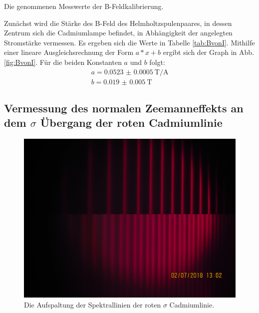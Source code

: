 \begin{table}
	\centering
	\caption{Die genommenen Messwerte der B-Feldkalibrierung.}
	
	
	\label{tab:BvonI}
\end{table}

Zunächst wird die Stärke des B-Feld des Helmholtzspulenpaares, in dessen Zentrum sich die Cadmiumlampe befindet, in Abhängigkeit der angelegten Stromstärke vermessen. Es ergeben sich die Werte in Tabelle \ref{tab:BvonI}. Mithilfe einer lineare Ausgleichsrechnung der Form $a*x+b$ ergibt sich der Graph in Abb. \ref{fig:BvonI}. Für die beiden Konstanten $a$ und $b$ folgt: 
\begin{gather}
	a = \SI{0.0523(5)}{\tesla\per\ampere}\\%
	b = \SI{0.019(5)}{\tesla}
\end{gather}

\subsection{\texorpdfstring{Vermessung des normalen Zeemanneffekts an dem $\sigma$ Übergang der roten Cadmiumlinie}{Vermessung des normalen Zeemanneffekts an dem sigma Übergang der roten Cadmiumlinie}}

\begin{figure}
	\centering
	\includegraphics[width=\linewidth-70pt,height=\textheight-70pt,keepaspectratio]{./content/Images/normalb0und1.JPG}
	\caption{Die Aufspaltung der Spektrallinien der roten $\sigma$ Cadmiumlinie.}
	\label{fig:normal}
\end{figure}

